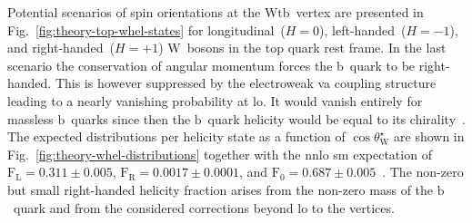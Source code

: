 
Potential scenarios of spin orientations at the $\mathrm{Wtb}$~vertex are presented in Fig.~\ref{fig:theory-top-whel-states} for longitudinal~($H=0$), left-handed~($H=-1$), and right-handed~($H=+1$) $\mathrm{W}$~bosons in the top quark rest frame. In the last scenario the conservation of angular momentum forces the $\mathrm{b}$~quark to be right-handed. This is however suppressed by the electroweak \gls{va} coupling structure leading to a nearly vanishing probability at \gls{lo}. It would vanish entirely for massless $\mathrm{b}$~quarks since then the $\mathrm{b}$~quark helicity would be equal to its chirality~\cite{Bernreuther:2008ju}. The expected distributions per helicity state as a function of $\cos\theta^\star_\mathrm{W}$ are shown in Fig.~\ref{fig:theory-whel-distributions} together with the \gls{nnlo} \gls{sm} expectation of $\mathrm{F}_\mathrm{L}=0.311\pm0.005$, $\mathrm{F}_\mathrm{R}=0.0017\pm0.0001$, and $\mathrm{F}_{0}=0.687\pm0.005$~\cite{Czarnecki:2010gb}. The non-zero but small right-handed helicity fraction arises from the non-zero mass of the $\mathrm{b}$~quark and from the considered corrections beyond \gls{lo} to the vertices.
 
